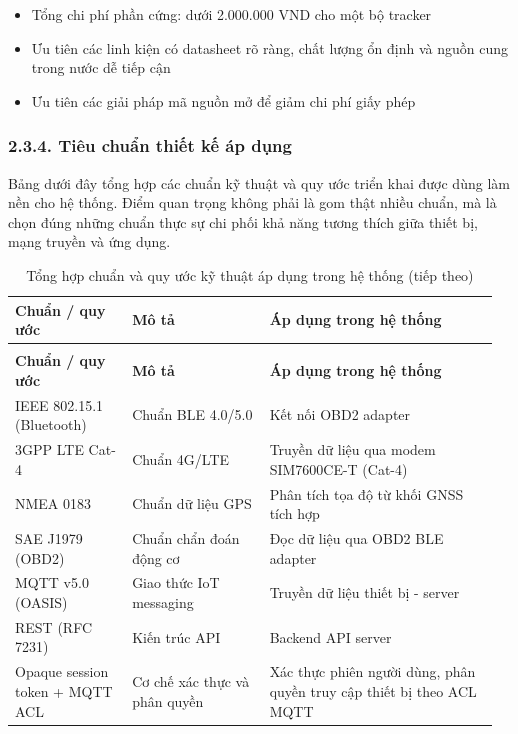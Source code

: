 \documentclass[a4paper]{extarticle}
\newcommand{\thesissettableid}[2]{%
  \renewcommand{\thetable}{#1}%
  \renewcommand{\theHtable}{#2}%
}
\providecommand{\tightlist}{%
  \setlength{\itemsep}{0pt}\setlength{\parskip}{0pt}}
\begin{document}
\begin{itemize}
\tightlist
\item
  Tổng chi phí phần cứng: dưới 2.000.000 VND cho một bộ tracker
\item
  Ưu tiên các linh kiện có datasheet rõ ràng, chất lượng ổn định và
  nguồn cung trong nước dễ tiếp cận
\item
  Ưu tiên các giải pháp mã nguồn mở để giảm chi phí giấy phép
\end{itemize}

\subsubsection{2.3.4. Tiêu chuẩn thiết kế áp
dụng}\label{234-tiuxeau-chuux1ea9n-thiux1ebft-kux1ebf-uxe1p-dux1ee5ng}

Bảng dưới đây tổng hợp các chuẩn kỹ thuật và quy ước triển khai được dùng
làm nền cho hệ thống. Điểm quan trọng không phải là gom thật nhiều chuẩn,
mà là chọn đúng những chuẩn thực sự chi phối khả năng tương thích giữa
thiết bị, mạng truyền và ứng dụng.


{\thesissettableid{2.3.4A}{tab-ch2-tong-hop-thong-tin-ve-tieu-chuan-mo-ta-ap-dung-trong}
\def\LTcaptype{table}
\begin{longtable}{|L{0.231\linewidth}|L{0.278\linewidth}|L{0.455\linewidth}|}
\caption{Tổng hợp chuẩn và quy ước kỹ thuật áp dụng trong hệ thống}\label{tab:ch2-tong-hop-thong-tin-ve-tieu-chuan-mo-ta-ap-dung-trong}\\
\hline \textbf{Chuẩn / quy ước} & \textbf{Mô tả} & \textbf{Áp dụng trong hệ thống} \\
\hline
\endfirsthead
\caption[]{Tổng hợp chuẩn và quy ước kỹ thuật áp dụng trong hệ thống (tiếp theo)}\\
\hline \textbf{Chuẩn / quy ước} & \textbf{Mô tả} & \textbf{Áp dụng trong hệ thống} \\
\hline
\endhead
\hline
\endfoot
\endlastfoot
IEEE 802.15.1 (Bluetooth) & Chuẩn BLE 4.0/5.0 & Kết nối OBD2 adapter \\\hline
3GPP LTE Cat-4 & Chuẩn 4G/LTE & Truyền dữ liệu qua modem SIM7600CE-T
(Cat-4) \\\hline
NMEA 0183 & Chuẩn dữ liệu GPS & Phân tích tọa độ từ khối GNSS tích hợp \\\hline
SAE J1979 (OBD2) & Chuẩn chẩn đoán động cơ & Đọc dữ liệu qua OBD2 BLE
adapter \\\hline
MQTT v5.0 (OASIS) & Giao thức IoT messaging & Truyền dữ liệu thiết bị -
server \\\hline
REST (RFC 7231) & Kiến trúc API & Backend API server \\\hline
Opaque session token + MQTT ACL & Cơ chế xác thực và phân quyền &
Xác thực phiên người dùng, phân quyền truy cập thiết bị theo ACL
MQTT \\\hline
\end{longtable}
}
\end{document}
